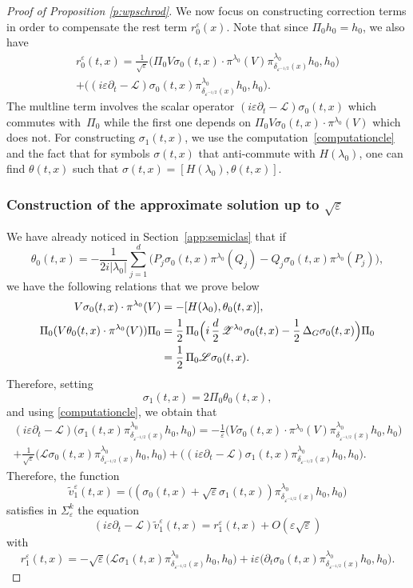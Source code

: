 \documentclass[10pt]{amsart}
\let\mathcal\mathscr
\theoremstyle{plain}
\theoremstyle{definition}
\let\eps\varepsilon
\begin{document}
\begin{proof}[Proof of Proposition \ref{p:wpschrod}]
We now focus on constructing correction terms in order to compensate the rest term $r_0^\eps(x)$. Note that since $\Pi_0 h_0=h_0$, we also have
\begin{multline*}
r_0^\eps(t,x)= \frac{1}{\sqrt\eps} \bigl(\Pi_0 V\sigma_0(t,x)\cdot \pi^{\lambda_0}(V)\pi^{\lambda_0}_{\delta_{\eps^{-1/2}}(x)}h_0,h_0\bigr)\\
+\bigl((i\eps\partial_t -\mathcal{L})\sigma_0(t,x)\pi^{\lambda_0}_{\delta_{\eps^{-1/2}}(x)}h_0,h_0\bigr).
\end{multline*}
The multline term involves the scalar operator $(i\eps\partial_t -\mathcal{L})\sigma_0(t,x)$ which commutes with~$\Pi_0$ while the first one depends on $\Pi_0 V\sigma_0(t,x)\cdot \pi^{\lambda_0}(V)$ which does not. For constructing $\sigma_1(t,x)$, we use the computation~\eqref{computationcle} and
the fact that for symbols $\sigma(t,x)$ that anti-commute with $H(\lambda_0)$, one can find $\theta(t,x)$ such that
$\sigma(t,x)= [H(\lambda_0),\theta(t,x)]$.

\subsubsection*{Construction of the approximate solution up to $\sqrt\eps$}
We have already noticed in Section~\ref{app:semiclas} that if
\[
\theta_0(t,x)= -\frac 1 {2i|\lambda_0|} \sum_{j=1}^{d}\bigl(P_j \sigma_0(t,x) \pi^{\lambda_0}(Q_j) - Q_j\sigma_0(t,x) \pi^{\lambda_0}(P_j)\bigr),
\]
we have the following relations that we prove below
\begin{align}\label{relation1}
V \sigma_0(t,x)\cdot \pi^{\lambda_0}(V) & =- [H(\lambda_0), \theta_0(t,x)],\\
\label{relation2}
\Pi_0 (V \theta_0(t,x)\cdot\pi^{\lambda_0}(V)) \Pi_0 &= \frac12\, \Pi_0 \Bigl(i\,\frac{d}{2}\, \mathcal Z ^{\lambda_0} \sigma_0(t,x) -\frac 12\,\Delta_G \sigma_0(t,x) \Bigr)\Pi_0\\
&= \frac 12\, \Pi_0 \mathcal{L}\sigma_0(t,x).\notag
\end{align}
Therefore, setting
\[
\sigma_1(t,x)= 2 \Pi_0 \theta_0(t,x),
\]
and using \eqref{computationcle}, we obtain that
\begin{multline*}
(i\eps\partial_t-\mathcal{L})\bigl(\sigma_1(t,x)\pi^{\lambda_0}_{\delta_{\eps^{-1/2}}(x)}h_0,h_0\bigr)=
-\frac{1}{\eps}\bigl(V \sigma_0(t,x)\cdot \pi^{\lambda_0}(V) \pi^{\lambda_0}_{\delta_{\eps^{-1/2}}(x)}h_0,h_0\bigr)\\
 +\frac{1}{\sqrt\eps}\bigl(\mathcal{L} \sigma_0(t,x) \pi^{\lambda_0}_{\delta_{\eps^{-1/2}}(x)}h_0,h_0\bigr)
+\bigl((i\eps\partial_t -\mathcal{L})\sigma_1(t,x)\pi^{\lambda_0}_{\delta_{\eps^{-1/2}}(x)}h_0,h_0\bigr).
\end{multline*}
Therefore, the function
\[
\widetilde v^\eps_1(t,x)= \bigl((\sigma_0(t,x) +\sqrt\eps \sigma_1(t,x))\pi^{\lambda_0}_{\delta_{\eps^{-1/2}}(x)}h_0,h_0\bigr)
\]
satisfies in $\Sigma^k_\eps$ the equation
\[
(i\eps\partial_t-\mathcal{L})\widetilde v^\eps_1(t,x)= r^\eps_1(t,x)+O(\eps\sqrt\eps)
\]
with
\[
r^\eps_1(t,x) = -\sqrt\eps
\bigl(\mathcal{L}\sigma_1(t,x)\pi^{\lambda_0}_{\delta_{\eps^{-1/2}}(x)}h_0,h_0\bigr)
+ i\eps \bigl(\partial_t \sigma_0 (t,x)\pi^{\lambda_0}_{\delta_{\eps^{-1/2}}(x)}h_0,h_0\bigr).
\]


\end{proof}
\end{document}
